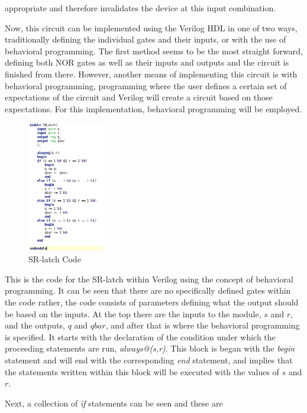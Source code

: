 \documentclass[12pt]{article}
\begin{document}
    appropriate and therefore invalidates the device at this input combination.
    \par Now, this circuit can be implemented using the Verilog HDL in one of
    two ways, traditionally defining the individual gates and their inputs, or
    with the use of behavioral programming. The first method seems to be the
    most straight forward, defining both NOR gates as well as their inputs and
    outputs and the circuit is finished from there. However, another means of
    implementing this circuit is with behavioral programming, programming where
    the user defines a certain set of expectations of the circuit and Verilog
    will create a circuit based on those expectations. For this implementation,
    behavioral programming will be employed.
    \begin{figure}[h]
        \centering
        \includegraphics[width=0.3\textwidth]{SRLatch Code.png}
        \caption{SR-latch Code}
    \end{figure}
    \par This is the code for the SR-latch within Verilog using the concept of
    behavioral programming. It can be seen that there are  no specifically
    defined gates within the code rather, the code consists of parameters
    defining what the output should be based on the inputs. At the top there are
    the inputs to the module, $s$ and $r$, and the outputs, $q$ and $qbar$, and
    after that is where the behavioral programming is specified. It starts with
    the declaration of the condition under which the proceeding statements are
    run, \textit{always@(s,r)}. This block is began with the \textit{begin}
    statement and will end with the corresponding \textit{end} statement, and
    implies that the statements written within this block will be executed with
    the values of $s$ and $r$.
    \par Next, a collection of \textit{if} statements can be seen and these are
\end{document}
